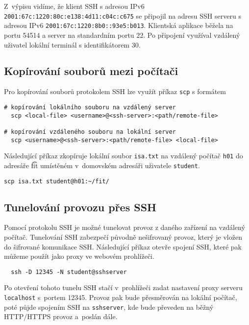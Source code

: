 Z~výpisu vidíme, že klient SSH s adresou IPv6 {\tt 2001:67c:1220:80c:e138:4d11:c04c:c675} se připojil na adresu SSH serveru s adresou IPv6 {\tt 2001:67c:1220:8b0::93e5:b013}. Klientská aplikace běžela na portu 54514 a server na standardním portu 22. Po připojení využíval vzdálený uživatel lokální terminál s identifikátorem 30. 

\subsection{Kopírování souborů mezi počítači}
Pro kopírování souborů protokolem SSH lze využít příkaz {\tt scp} s formátem
\begin{verbatim}
# kopírování lokálního souboru na vzdálený server
  scp <local-file> <username>@<ssh-server>:<path/remote-file>

# kopírování vzdáleného souboru na lokální server 
  scp <username>@<ssh-server>:<path/remote-file> <local-file>
\end{verbatim}
Následující příkaz zkopíruje lokální soubor {\tt isa.txt} na vzdálený počítač {\tt h01} do adresáře {\t fit} umístěném v~domovském adresáři uživatele {\tt student}.
\begin{verbatim}
scp isa.txt student@h01:~/fit/
\end{verbatim}

\subsection{Tunelování provozu přes SSH}
Pomocí protokolu SSH je možné tunelovat provoz z daného zařízení na vzdálený počítač. Tunelování SSH zabezpečí původně nešifrovaný provoz, který je vložen do šifrované komunikace SSH. Následující příkaz otevře spojení SSH, které pak můžeme použít jako proxy ve webovém prohlížeči.
\begin{verbatim}
  ssh -D 12345 -N student@sshserver
\end{verbatim}
Po otevření tohoto tunelu SSH stačí v~prohlížeči zadat nastavení proxy serveru {\tt localhost} s~portem 12345. Provoz pak bude přesměrován na lokální počítač, poté půjde spojením SSH na  {\tt sshserver}, kde bude převeden na běžný HTTP/HTTPS provoz a~poslán dále. 

